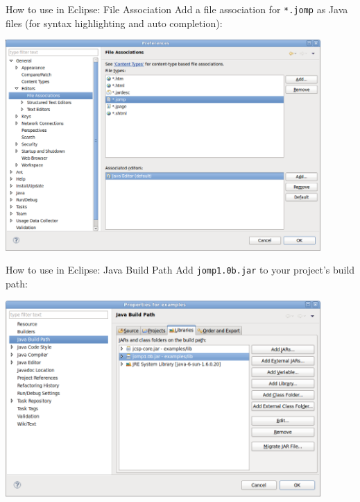 \begin{frame}{How to use in Eclipse: File Association}
  Add a file association for \lstinline!*.jomp! as Java files (for
  syntax highlighting and auto completion):


  \begin{center}
    \includegraphics[width=0.9\textwidth]{figures/jomp-file-associations}
  \end{center}
\end{frame}

\begin{frame}{How to use in Eclipse: Java Build Path}
  Add \lstinline!jomp1.0b.jar! to your project's build path:


  \begin{center}
    \includegraphics[width=0.9\textwidth]{figures/jomp-build-path}
  \end{center}
\end{frame}

